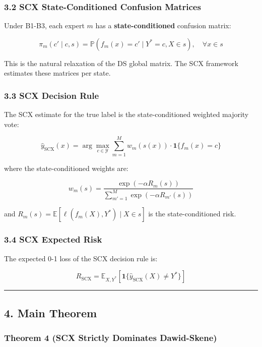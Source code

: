 \documentclass[
  12pt,
]{ctexart}
\begin{document}
\subsubsection{3.2 SCX State-Conditioned Confusion
Matrices}\label{scx-state-conditioned-confusion-matrices}

Under B1-B3, each expert \(m\) has a \textbf{state-conditioned}
confusion matrix:

\[\pi_m(c' \mid c, s) = \mathbb{P}(f_m(x) = c' \mid Y^* = c, X \in s), \quad \forall x \in s\]

This is the natural relaxation of the DS global matrix. The SCX
framework estimates these matrices per state.

\subsubsection{3.3 SCX Decision Rule}\label{scx-decision-rule}

The SCX estimate for the true label is the state-conditioned weighted
majority vote:

\[\hat{y}_{\text{SCX}}(x) = \arg\max_{c \in \mathcal{Y}} \sum_{m=1}^M w_m(s(x)) \cdot \mathbf{1}\{f_m(x) = c\}\]

where the state-conditioned weights are:

\[w_m(s) = \frac{\exp(-\alpha R_m(s))}{\sum_{m'=1}^M \exp(-\alpha R_{m'}(s))}\]

and \(R_m(s) = \mathbb{E}[\ell(f_m(X), Y^*) \mid X \in s]\) is the
state-conditioned risk.

\subsubsection{3.4 SCX Expected Risk}\label{scx-expected-risk}

The expected 0-1 loss of the SCX decision rule is:

\[R_{\text{SCX}} = \mathbb{E}_{X, Y^*}\left[ \mathbf{1}\{\hat{y}_{\text{SCX}}(X) \neq Y^*\} \right]\]

\begin{center}\rule{0.5\linewidth}{0.5pt}\end{center}

\subsection{4. Main Theorem}\label{main-theorem}

\subsubsection{Theorem 4 (SCX Strictly Dominates
Dawid-Skene)}\label{theorem-4-scx-strictly-dominates-dawid-skene}
\end{document}
